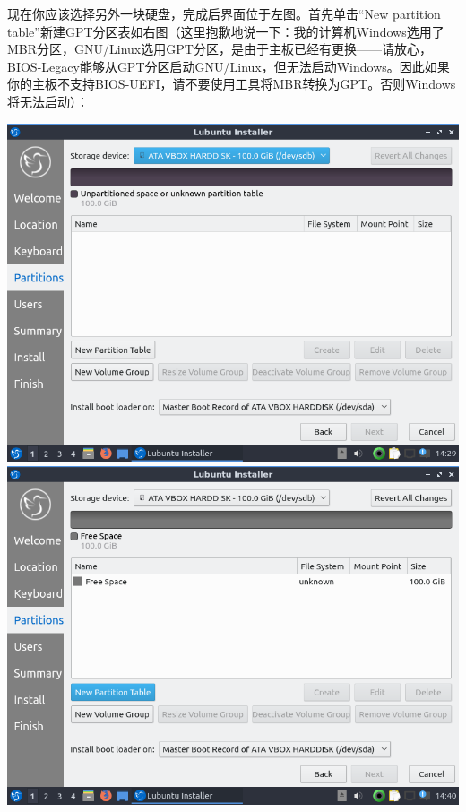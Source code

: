 现在你应该选择另外一块硬盘，完成后界面位于左图。首先单击“New partition table”新建GPT分区表如右图（这里抱歉地说一下：我的计算机Windows选用了MBR分区，GNU/Linux选用GPT分区，是由于主板已经有更换——请放心，BIOS-Legacy能够从GPT分区启动GNU/Linux，但无法启动Windows。因此如果你的主板不支持BIOS-UEFI，请不要使用工具将MBR转换为GPT。否则Windows将无法启动）：
\begin{center}
	\includegraphics[scale=0.4]{pic/lubinst8}	\includegraphics[scale=0.4]{pic/lubinst9}\\

\end{center}
